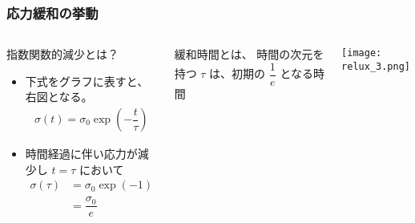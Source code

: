 \documentclass[12pt, dvipdfmx]{beamer}
\begin{document}
\begin{frame}
	\frametitle{応力緩和の挙動}
		\begin{columns}[T, onlytextwidth]
				\begin{exampleblock}{指数関数的減少とは？}
					\begin{itemize}
						\item 下式をグラフに表すと、右図となる。
						\begin{align*}
							\sigma(t) = \sigma_0 \exp \left(-\dfrac{t}{\tau} \right)
						\end{align*}
						\item 時間経過に伴い応力が減少し $t = \tau$ において
						\begin{align*}
							\sigma(\tau) 
							&= \sigma_0 \exp(-1)\\ 
							&= \dfrac{\sigma_0}{e}
						\end{align*}
					\end{itemize}
				\end{exampleblock}
				\begin{alertblock}{緩和時間とは、}
					時間の次元を持つ $\tau$ は、初期の $\dfrac{1}{e}$ となる時間
				\end{alertblock}
				\begin{center}
					\texttt{[image: relux\_3.png]}
				\end{center}
		\end{columns}
\end{frame}
\end{document}
